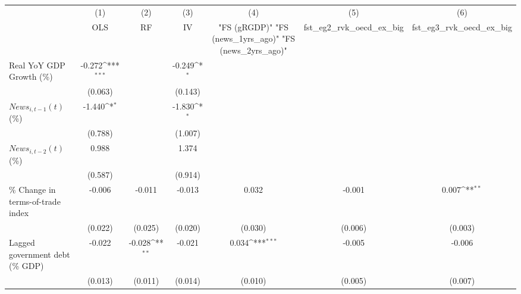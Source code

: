 {
\def\sym#1{\ifmmode^{#1}\else\(^{#1}\)\fi}
\begin{tabular}{l*{6}{c}}
\toprule
                    &\multicolumn{1}{c}{(1)}&\multicolumn{1}{c}{(2)}&\multicolumn{1}{c}{(3)}&\multicolumn{1}{c}{(4)}&\multicolumn{1}{c}{(5)}&\multicolumn{1}{c}{(6)}\\
                    &\multicolumn{1}{c}{OLS}&\multicolumn{1}{c}{RF}&\multicolumn{1}{c}{IV}&\multicolumn{1}{c}{ "FS (gRGDP)"  "FS (news_1yrs_ago)"  "FS (news_2yrs_ago)" }&\multicolumn{1}{c}{fst_eg2_rvk_oecd_ex_big}&\multicolumn{1}{c}{fst_eg3_rvk_oecd_ex_big}\\
\midrule
Real YoY GDP Growth (\%)&      -0.272\sym{***}&                     &      -0.249\sym{*}  &                     &                     &                     \\
                    &     (0.063)         &                     &     (0.143)         &                     &                     &                     \\
\addlinespace
$ News_{i,t-1}(t)$ (\%)&      -1.440\sym{*}  &                     &      -1.830\sym{*}  &                     &                     &                     \\
                    &     (0.788)         &                     &     (1.007)         &                     &                     &                     \\
\addlinespace
$ News_{i,t-2}(t)$ (\%)&       0.988         &                     &       1.374         &                     &                     &                     \\
                    &     (0.587)         &                     &     (0.914)         &                     &                     &                     \\
\addlinespace
\% Change in terms-of-trade index&      -0.006         &      -0.011         &      -0.013         &       0.032         &      -0.001         &       0.007\sym{**} \\
                    &     (0.022)         &     (0.025)         &     (0.020)         &     (0.030)         &     (0.006)         &     (0.003)         \\
\addlinespace
Lagged government debt (\% GDP)&      -0.022         &      -0.028\sym{**} &      -0.021         &       0.034\sym{***}&      -0.005         &      -0.006         \\
                    &     (0.013)         &     (0.011)         &     (0.014)         &     (0.010)         &     (0.005)         &     (0.007)         \\

\end{tabular}}
